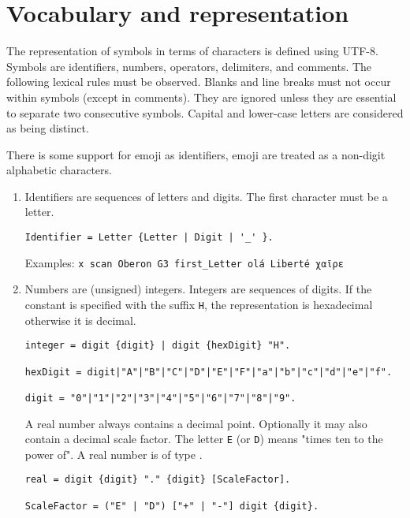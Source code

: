 \documentclass[12pt]{article}
\begin{document}
\section{Vocabulary and representation}

The representation of symbols in terms of characters is defined using UTF-8. Symbols are identifiers, numbers, operators, delimiters, and comments. The following lexical rules must be observed. Blanks and line breaks must not occur within symbols (except in comments). They are ignored unless they are essential to separate two consecutive symbols. Capital and lower-case letters are considered as being distinct. 

There is some support for emoji as identifiers, emoji are treated as a non-digit alphabetic characters.

\begin{enumerate}
    \item Identifiers are sequences of letters and digits. The first character must be a letter.
    
\begin{lstlisting}[style=ebnf]
Identifier = Letter {Letter | Digit | '_' }.
\end{lstlisting}

Examples: \lstinline!x scan Oberon G3 first_Letter olá Liberté χαῖρε! 

\item Numbers are (unsigned) integers. Integers are sequences of digits. 
If the constant is specified with the suffix \lstinline!H!, the representation is hexadecimal otherwise it is decimal.

\begin{lstlisting}[style=ebnf]
integer = digit {digit} | digit {hexDigit} "H".

hexDigit = digit|"A"|"B"|"C"|"D"|"E"|"F"|"a"|"b"|"c"|"d"|"e"|"f".

digit = "0"|"1"|"2"|"3"|"4"|"5"|"6"|"7"|"8"|"9".
\end{lstlisting}

A real number always contains a decimal point. Optionally it may also contain a decimal scale factor.
The letter \lstinline!E! (or \lstinline!D!) means "times ten to the power of". A real number is of type \REAL.

\begin{lstlisting}[style=ebnf]
real = digit {digit} "." {digit} [ScaleFactor]. 

ScaleFactor = ("E" | "D") ["+" | "-"] digit {digit}.
\end{lstlisting}


\end{enumerate}
\end{document}
